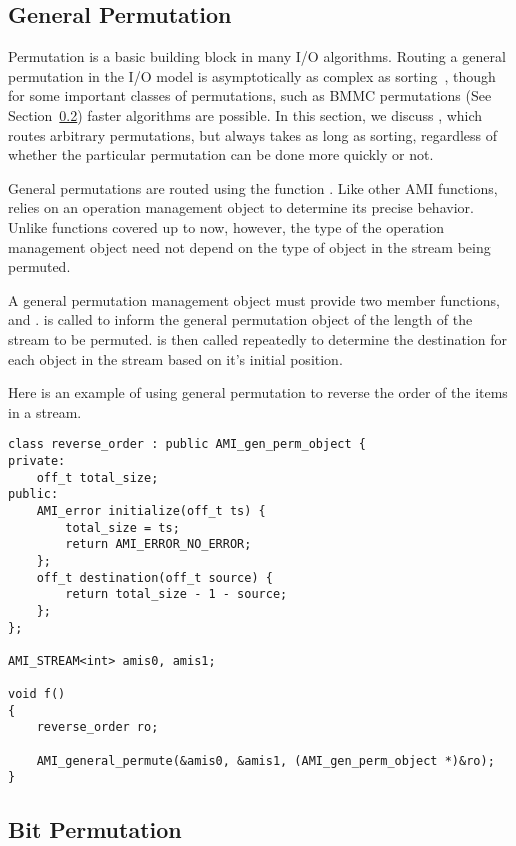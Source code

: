 \subsection{General Permutation}

Permutation is a basic building block in many I/O algorithms. Routing a
general permutation in the I/O model is asymptotically as complex as
sorting~\cite{aggarwal:input}, though for some important classes of
permutations, such as BMMC permutations (See
Section~\ref{sec:bit-permuting}) faster algorithms are possible. In this
section, we discuss
, which routes arbitrary permutations, but
always takes as long as sorting, regardless of whether the particular
permutation can be done more quickly or not.

General permutations are routed using the function
.  Like other AMI functions,
 relies on an operation management
object to determine its precise
behavior.  Unlike functions covered up to now, however, the type of
the operation management object
need not depend on the type of object in the stream being permuted.

A general permutation management object must provide two member
functions,  and .
 is called to inform the general permutation object
of the length of the stream to be permuted.   is
then called repeatedly to determine the destination for each object in
the stream based on it's initial position.

Here is an example of using general permutation to reverse the order
of the items in a stream.

\begin{verbatim}
class reverse_order : public AMI_gen_perm_object {
private:
    off_t total_size;
public:
    AMI_error initialize(off_t ts) { 
        total_size = ts; 
        return AMI_ERROR_NO_ERROR;
    };
    off_t destination(off_t source) {
        return total_size - 1 - source;
    };
};

AMI_STREAM<int> amis0, amis1;    

void f()
{
    reverse_order ro;

    AMI_general_permute(&amis0, &amis1, (AMI_gen_perm_object *)&ro);
}
\end{verbatim}

\subsection{Bit Permutation}
\label{sec:bit-permuting}


